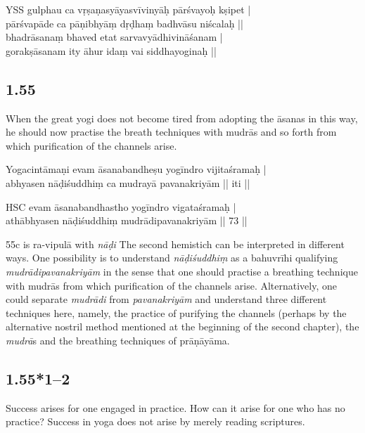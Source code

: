 \begin{ekdosis}
\begin{testimonia}[hp01_053]
YSS
\startverse
gulphau ca vṛṣaṇasyāyasvīvinyāḥ pārśvayoḥ kṣipet |\\
pārśvapāde ca pāṇibhyāṃ dṛḍhaṃ badhvāsu niścalaḥ ||\\
bhadrāsanaṃ bhaved etat sarvavyādhivināśanam |\\
gorakṣāsanam ity āhur idaṃ vai siddhayoginaḥ ||
\endverse
\end{testimonia}

\subsection*{1.55}
\begin{translation}[hp01_055]
When the great yogi does not become tired from adopting the āsanas in this way, he should now practise the breath techniques with mudrās and so forth from which purification of the channels arise.
\end{translation}

\begin{sources}[hp01_055]
\end{sources}

\begin{testimonia}[hp01_055]
Yogacintāmaṇi
\startverse
evam āsanabandheṣu yogīndro vijitaśramaḥ |\\
abhyasen nāḍiśuddhiṃ ca mudrayā pavanakriyām || iti ||
\endverse

HSC
\startverse
evam āsanabandhastho yogīndro vigataśramaḥ |\\
athābhyasen nāḍiśuddhiṃ mudrādipavanakriyām || 73 ||
\endverse
\end{testimonia}

\begin{philcomm}[hp01_055]
55c is ra-vipulā with \emph{nāḍi}
The second hemistich can be interpreted in different ways. One possibility is to understand \emph{nāḍiśuddhiṃ} as a bahuvrīhi qualifying \emph{mudrādipavanakriyām} in the sense that one should practise a breathing technique with mudrās from which purification of the channels arise. Alternatively, one could separate \emph{mudrādi} from \emph{pavanakriyām} and understand three different techniques here, namely, the practice of purifying the channels (perhaps by the alternative nostril method mentioned at the beginning of the second chapter), the \emph{mudrā}s and the breathing techniques of prāṇāyāma.  
\end{philcomm}

\subsection*{1.55*1--2}
\begin{translation}[hp01_055_1]
Success arises for one engaged in practice. How can it arise for one who has no practice? Success in yoga does not arise by merely reading scriptures.


\end{translation}
\end{ekdosis}
